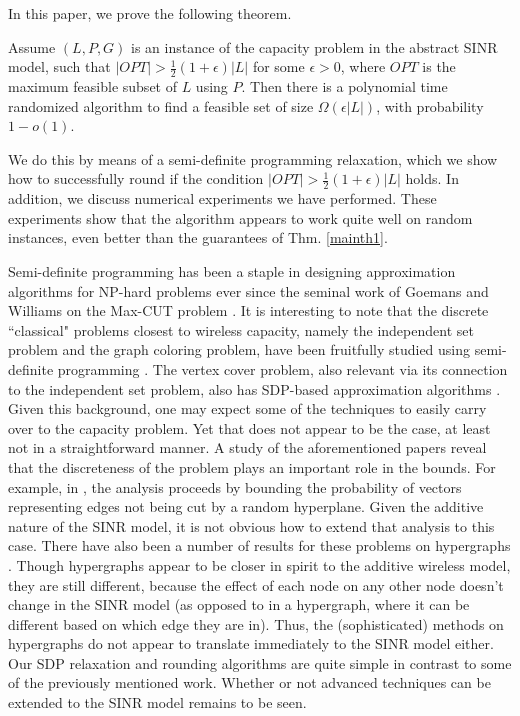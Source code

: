 \documentclass[11pt]{amsart}
\begin{document}
In this paper, we prove the following theorem.
\begin{theorem}
Assume $(L, P, G)$ is an instance of the capacity problem in the abstract SINR model, such that $|OPT| > \frac{1}{2}(1 + \epsilon) |L|$ for some $\epsilon > 0$, where $OPT$ is the maximum feasible subset of $L$ using $P$. Then there is a polynomial time randomized algorithm to find a feasible set of size $\Omega(\epsilon |L|)$, with probability $1 - o(1)$.
\label{mainth1}
\end{theorem}


We do this by means of a semi-definite programming relaxation, which we show how to successfully round if the condition 
 $|OPT| > \frac{1}{2}(1 + \epsilon) |L|$  holds. In addition, we discuss numerical experiments we have performed. These experiments show that the algorithm appears to work quite well on random instances, even better than the guarantees of
 Thm. \ref{mainth1}.
 
 Semi-definite programming has been a staple in designing approximation algorithms for NP-hard problems ever
 since the seminal work of Goemans and Williams on the Max-CUT problem \cite{Goemans:1995:IAA:227683.227684}. 
 It is interesting to note that the discrete ``classical" problems closest to wireless capacity, namely the independent set
 problem and the graph coloring problem, have been  fruitfully studied using semi-definite programming \cite{Halperin:2002:CK-:606216.606221,Karger:1998:AGC:274787.274791}. The vertex cover problem, also relevant via its connection
 to the independent set problem,  also has
SDP-based approximation algorithms 
\cite{Halperin:2000:IAA:338219.338269,Karakostas:2009:BAR:1597036.1597045}. Given this background, one may expect some of the techniques to easily carry over to the capacity
 problem. Yet that does not appear to be the case, at least not in a straightforward manner. A study of the aforementioned
 papers reveal that the discreteness of the problem plays an important role in the bounds. For example, in 
\cite{Karger:1998:AGC:274787.274791}, the analysis proceeds by bounding the probability of vectors representing edges not being cut by a random hyperplane. Given the additive nature of the SINR model, it is not obvious
how to extend that analysis to this case. There  have also been a number of results for these problems on hypergraphs \cite{Krivelevich:2001:ACM:365411.365469,DBLP:conf/focs/Chlamtac07,DBLP:conf/approx/ChlamtacS08}. Though hypergraphs appear to be closer in spirit to the additive wireless model, they
are still different, because the effect of each node on 
any other node doesn't change in the SINR model (as opposed to in a hypergraph, where it can be different based on which edge they are in). Thus, the (sophisticated) methods on hypergraphs 
do not appear to  translate immediately to the SINR model either. Our SDP relaxation and rounding algorithms are
quite simple in contrast to some of the previously mentioned work. Whether or not advanced techniques can be extended to the SINR model remains to be seen. 
\end{document}
